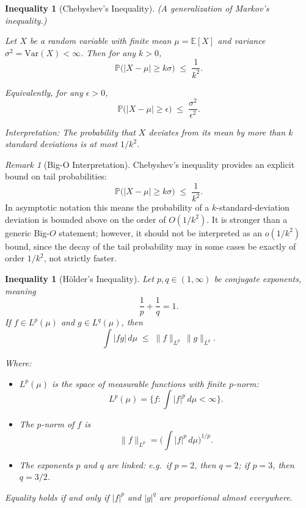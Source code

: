 \documentclass[11pt]{article}
\theoremstyle{plain}
\newtheorem{inequality}[theorem]{Inequality}
\theoremstyle{definition}
\theoremstyle{remark}
\newtheorem{remark}[theorem]{Remark}
\newcommand{\E}{\mathbb{E}}
\newcommand{\Var}{\mathrm{Var}}
\newcommand{\1}{\mathbbm{1}}
\begin{document}
\vspace{1em}

\begin{inequality}[Chebyshev’s Inequality]
(A generalization of Markov’s inequality.) 

Let $X$ be a random variable with finite mean $\mu=\E[X]$ and variance $\sigma^2=\Var(X)<\infty$.  
Then for any $k>0$,
\[
\mathbb{P}\big(|X-\mu|\ge k\sigma\big) \;\le\; \frac{1}{k^2}.
\]

Equivalently, for any $\epsilon>0$,
\[
\mathbb{P}\big(|X-\mu|\ge \epsilon\big) \;\le\; \frac{\sigma^2}{\epsilon^2}.
\]

\emph{Interpretation:} The probability that $X$ deviates from its mean by more than $k$ standard deviations is at most $1/k^2$.
\end{inequality}

\begin{remark}[Big-O Interpretation]
Chebyshev’s inequality provides an explicit bound on tail probabilities:
\[
\mathbb{P}\big(|X-\mu|\ge k\sigma\big) \;\le\; \frac{1}{k^2}.
\]
In asymptotic notation this means the probability of a $k$-standard-deviation
deviation is bounded above on the order of $O(1/k^2)$. It is stronger than
a generic Big-$O$ statement; however, it should not be interpreted as an $o(1/k^2)$ bound, since the
decay of the tail probability may in some cases be exactly of order
$1/k^2$, not strictly faster.
\end{remark}

\vspace{1em}

\begin{inequality}[Hölder’s Inequality]
Let $p,q \in (1,\infty)$ be \emph{conjugate exponents}, meaning 
\[
\frac{1}{p} + \frac{1}{q} = 1.
\]
If $f \in L^p(\mu)$ and $g \in L^q(\mu)$, then
\[
\int |fg|\, d\mu \;\le\; \|f\|_{L^p}\, \|g\|_{L^q}.
\]

Where:
\begin{itemize}
  \item $L^p(\mu)$ is the space of measurable functions with finite $p$-norm:
  \[
  L^p(\mu) = \Big\{ f : \int |f|^p \, d\mu < \infty \Big\}.
  \]
  \item The $p$-norm of $f$ is
  \[
  \|f\|_{L^p} = \Big(\int |f|^p \, d\mu\Big)^{1/p}.
  \]
  \item The exponents $p$ and $q$ are linked: e.g.\ if $p=2$, then $q=2$; if $p=3$, then $q=3/2$.
\end{itemize}

\emph{Equality} holds if and only if $|f|^p$ and $|g|^q$ are proportional almost everywhere.
\end{inequality}
\end{document}
